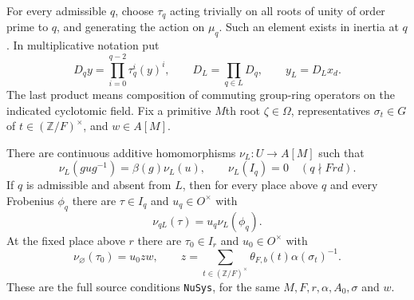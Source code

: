 For every admissible $q$, choose $\tau_q$ acting trivially on all
roots of unity of order prime to $q$, and generating the action on
$\mu_q$.  Such an element exists in inertia at $q$.
In multiplicative notation put
\[
 D_q y=\prod_{i=0}^{q-2}\tau_q^i(y)^i,
 \qquad D_L=\prod_{q\in L}D_q,
 \qquad y_L=D_Lx_d.
 \tag{OS.13}
\]
The last product means composition of commuting group-ring operators
on the indicated cyclotomic field.  Fix a primitive $M$th root
$\zeta\in\Omega$, representatives $\sigma_t\in G$ of
$t\in(\mathbb Z/F)^\times$, and $w\in A[M]$.

\begin{proposition}
There are continuous additive homomorphisms $\nu_L:U\to A[M]$
such that
\[
 \nu_L(gug^{-1})=\beta(g)\nu_L(u),\qquad
 \nu_L(I_q)=0\quad(q\nmid Frd).
 \tag{OS.14}
\]
If $q$ is admissible and absent from $L$, then for every place above
$q$ and every Frobenius $\phi_q$ there are
$\tau\in I_q$ and $u_q\in O^\times$ with
\[
                  \nu_{qL}(\tau)=u_q\nu_L(\phi_q).
 \tag{OS.15}
\]
At the fixed place above $r$ there are $\tau_0\in I_r$ and
$u_0\in O^\times$ with
\[
 \nu_\varnothing(\tau_0)=u_0zw,\qquad
 z=\sum_{t\in(\mathbb Z/F)^\times}
          \theta_{F,b}(t)\alpha(\sigma_t)^{-1}.
 \tag{OS.16}
\]
These are the full source conditions \texttt{NuSys}, for the same
$M,F,r,\alpha,A_0,\sigma$ and $w$.
\end{proposition}
